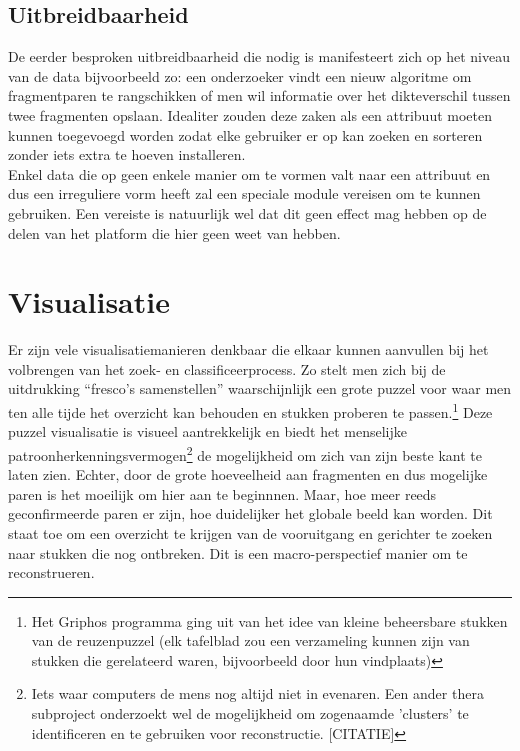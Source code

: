 
\subsection{Uitbreidbaarheid}
De eerder besproken uitbreidbaarheid die nodig is manifesteert zich op het niveau van de data bijvoorbeeld zo: een onderzoeker vindt een nieuw algoritme om fragmentparen te rangschikken of men wil informatie over het dikteverschil tussen twee fragmenten opslaan. Idealiter zouden deze zaken als een attribuut moeten kunnen toegevoegd worden zodat elke gebruiker er op kan zoeken en sorteren zonder iets extra te hoeven installeren.\\
 
Enkel data die op geen enkele manier om te vormen valt naar een attribuut en dus een irreguliere vorm heeft zal een speciale module vereisen om te kunnen gebruiken. Een vereiste is natuurlijk wel dat dit geen effect mag hebben op de delen van het platform die hier geen weet van hebben.
 
\section{Visualisatie}
Er zijn vele visualisatiemanieren denkbaar die elkaar kunnen aanvullen bij het volbrengen van het zoek- en classificeerprocess. Zo stelt men zich bij de uitdrukking ``fresco's samenstellen'' waarschijnlijk een grote puzzel voor waar men ten alle tijde het overzicht kan behouden en stukken proberen te passen.\footnote{Het Griphos programma ging uit van het idee van kleine beheersbare stukken van de reuzenpuzzel (elk tafelblad zou een verzameling kunnen zijn van stukken die gerelateerd waren, bijvoorbeeld door hun vindplaats)} Deze puzzel visualisatie is visueel aantrekkelijk en biedt het menselijke patroonherkenningsvermogen\footnote{Iets waar computers de mens nog altijd niet in evenaren. Een ander thera subproject onderzoekt wel de mogelijkheid om zogenaamde 'clusters' te identificeren en te gebruiken voor reconstructie. [CITATIE]} de mogelijkheid om zich van zijn beste kant te laten zien. Echter, door de grote hoeveelheid aan fragmenten en dus mogelijke paren is het moeilijk om hier aan te beginnnen. Maar, hoe meer reeds geconfirmeerde paren er zijn, hoe duidelijker het globale beeld kan worden. Dit staat toe om een overzicht te krijgen van de vooruitgang en gerichter te zoeken naar stukken die nog ontbreken. Dit is een macro-perspectief manier om te reconstrueren.\\

